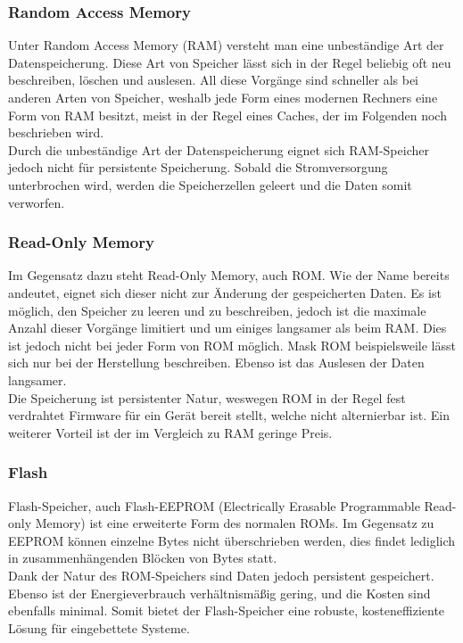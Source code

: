 \subsubsection{Random Access Memory}
Unter Random Access Memory (RAM) versteht man eine unbeständige Art der Datenspeicherung. Diese Art von Speicher lässt sich in der Regel beliebig oft neu beschreiben, löschen und auslesen. All diese Vorgänge sind schneller als bei anderen Arten von Speicher, weshalb jede Form eines modernen Rechners eine Form von RAM besitzt, meist in der Regel eines Caches, der im Folgenden noch beschrieben wird.\\
Durch die unbeständige Art der Datenspeicherung eignet sich RAM-Speicher jedoch nicht für persistente Speicherung. Sobald die Stromversorgung unterbrochen wird, werden die Speicherzellen geleert und die Daten somit verworfen.

\subsubsection{Read-Only Memory}
Im Gegensatz dazu steht Read-Only Memory, auch ROM. Wie der Name bereits andeutet, eignet sich dieser nicht zur Änderung der gespeicherten Daten. Es ist möglich, den Speicher zu leeren und zu beschreiben, jedoch ist die maximale Anzahl dieser Vorgänge limitiert und um einiges langsamer als beim RAM. Dies ist jedoch nicht bei jeder Form von ROM möglich. Mask ROM beispielsweile lässt sich nur bei der Herstellung beschreiben. Ebenso ist das Auslesen der Daten langsamer.\\
Die Speicherung ist persistenter Natur, weswegen ROM in der Regel fest verdrahtet Firmware für ein Gerät bereit stellt, welche nicht alternierbar ist. Ein weiterer Vorteil ist der im Vergleich zu RAM geringe Preis.

\subsubsection{Flash}
Flash-Speicher, auch Flash-EEPROM (Electrically Erasable Programmable Read-only Memory) ist eine erweiterte Form des normalen ROMs. Im Gegensatz zu EEPROM können einzelne Bytes nicht überschrieben werden, dies findet lediglich in zusammenhängenden Blöcken von Bytes statt.\\
Dank der Natur des ROM-Speichers sind Daten jedoch persistent gespeichert. Ebenso ist der Energieverbrauch verhältnismäßig gering, und die Kosten sind ebenfalls minimal. Somit bietet der Flash-Speicher eine robuste, kosteneffiziente Lösung für eingebettete Systeme.

